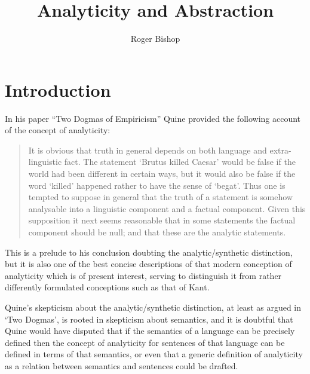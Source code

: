 \documentclass{rbjk}
\begin{document}
                                                                                   
\begin{article}
\begin{opening}  
\title{Analyticity and Abstraction}
\author{Roger Bishop }

\begin{abstract}


\end{abstract}
\end{opening}

\section{Introduction}

In his paper ``Two Dogmas of Empiricism'' \cite{Quine53} Quine provided the following account of the concept of analyticity:

\begin{quote}
 It is obvious that truth in general depends on both language and extra-linguistic fact. The statement `Brutus killed Caesar' would be false if the world had been different in certain ways, but it would also be false if the word `killed' happened rather to have the sense of `begat'. Thus one is tempted to suppose in general that the truth of a statement is somehow analysable into a linguistic component and a factual component.
 Given this supposition it next seems reasonable that in some statements the factual component should be null; and that these are the analytic statements.
\end{quote}

This is a prelude to his conclusion doubting the analytic/synthetic distinction, but it is also one of the best concise descriptions of that modern conception of analyticity which is of present interest, serving to distinguish it from rather differently formulated conceptions such as that of Kant.

Quine's skepticism about the analytic/synthetic distinction, at least as argued in `Two Dogmas', is rooted in skepticism about semantics, and it is doubtful that Quine would have disputed that if the semantics of a language can be precisely defined then the concept of analyticity for sentences of that language can be defined in terms of that semantics, or even that a generic definition of analyticity as a relation between semantics and sentences could be drafted.


\end{article}
\end{document}
